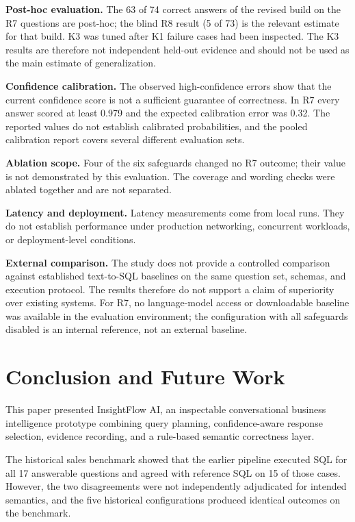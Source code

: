 \documentclass[conference]{IEEEtran}
\begin{document}
\textbf{Post-hoc evaluation.} The 63 of 74 correct answers of the revised build on the R7 questions are post-hoc; the blind R8 result (5 of 73) is the relevant estimate for that build. K3 was tuned after K1 failure cases had been inspected. The K3 results are therefore not independent held-out evidence and should not be used as the main estimate of generalization.

\textbf{Confidence calibration.} The observed high-confidence errors show that the current confidence score is not a sufficient guarantee of correctness. In R7 every answer scored at least 0.979 and the expected calibration error was 0.32. The reported values do not establish calibrated probabilities, and the pooled calibration report covers several different evaluation sets.

\textbf{Ablation scope.} Four of the six safeguards changed no R7 outcome; their value is not demonstrated by this evaluation. The coverage and wording checks were ablated together and are not separated.

\textbf{Latency and deployment.} Latency measurements come from local runs. They do not establish performance under production networking, concurrent workloads, or deployment-level conditions.

\textbf{External comparison.} The study does not provide a controlled comparison against established text-to-SQL baselines on the same question set, schemas, and execution protocol. The results therefore do not support a claim of superiority over existing systems. For R7, no language-model access or downloadable baseline was available in the evaluation environment; the configuration with all safeguards disabled is an internal reference, not an external baseline.

\section{Conclusion and Future Work}

This paper presented InsightFlow AI, an inspectable conversational business intelligence prototype combining query planning, confidence-aware response selection, evidence recording, and a rule-based semantic correctness layer.

The historical sales benchmark showed that the earlier pipeline executed SQL for all 17 answerable questions and agreed with reference SQL on 15 of those cases. However, the two disagreements were not independently adjudicated for intended semantics, and the five historical configurations produced identical outcomes on the benchmark.
\end{document}
